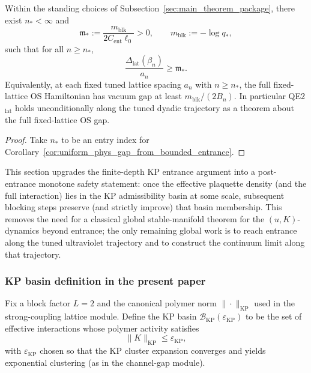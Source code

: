 \begin{theorem}\label{thm:physical_gap_from_gluing}
Within the standing choices of Subsection~\ref{sec:main_theorem_package}, there exist $n_\ast<\infty$ and
\[
\mathfrak m_\ast:=\frac{m_{\mathrm{blk}}}{2C_{\mathrm{ent}}\ell_0}>0,
\qquad m_{\mathrm{blk}}:=-\log q_\ast,
\]
such that for all $n\ge n_\ast$,
\[
\frac{\Delta_{\mathrm{lat}}(\beta_n)}{a_n}\ge \mathfrak m_\ast.
\]
Equivalently, at each fixed tuned lattice spacing $a_n$ with $n\ge n_\ast$, the full fixed-lattice OS Hamiltonian has vacuum gap at least $m_{\mathrm{blk}}/(2B_n)$.
In particular QE2$_{\mathrm{lat}}$ holds unconditionally along the tuned dyadic trajectory as a theorem about the full fixed-lattice OS gap.
\end{theorem}

\begin{proof}
Take $n_\ast$ to be an entry index for Corollary~\ref{cor:uniform_phys_gap_from_bounded_entrance}.
\end{proof}


This section upgrades the finite-depth KP entrance argument into a post-entrance monotone safety statement: once the effective plaquette density (and the full interaction) lies in the KP admissibility basin at some scale, subsequent blocking steps preserve (and strictly improve) that basin membership. This removes the need for a classical global stable-manifold theorem for the $(u,K)$-dynamics beyond entrance; the only remaining global work is to reach entrance along the tuned ultraviolet trajectory and to construct the continuum limit along that trajectory.

\subsubsection{KP basin definition in the present paper}
Fix a block factor $L=2$ and the canonical polymer norm $\|\cdot\|_{\mathrm{KP}}$ used in the strong-coupling lattice module. Define the KP basin $\mathcal B_{\mathrm{KP}}(\varepsilon_{\mathrm{KP}})$ to be the set of effective interactions whose polymer activity satisfies
\[
\|K\|_{\mathrm{KP}} \le \varepsilon_{\mathrm{KP}},
\]
with $\varepsilon_{\mathrm{KP}}$ chosen so that the KP cluster expansion converges and yields exponential clustering (as in the channel-gap module).

